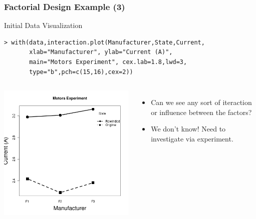 \documentclass[10pt]{beamer}
\begin{document}
\begin{frame}
  \frametitle{Factorial Design Example (3)}
  \begin{center}
    Initial Data Visualization
  \end{center}
{\small
\begin{verbatim}
> with(data,interaction.plot(Manufacturer,State,Current, 
       xlab="Manufacturer", ylab="Current (A)", 
       main="Motors Experiment", cex.lab=1.8,lwd=3,
       type="b",pch=c(15,16),cex=2))
\end{verbatim}
}
\begin{columns}[c]
  \includegraphics[width=1\textwidth]{img/fatorial2}
  \begin{itemize}
  \item Can we see any sort of iteraction or influence between the factors?
  \item We don't know! Need to investigate via experiment.
  \end{itemize}
\end{columns}
\end{frame}
\end{document}
